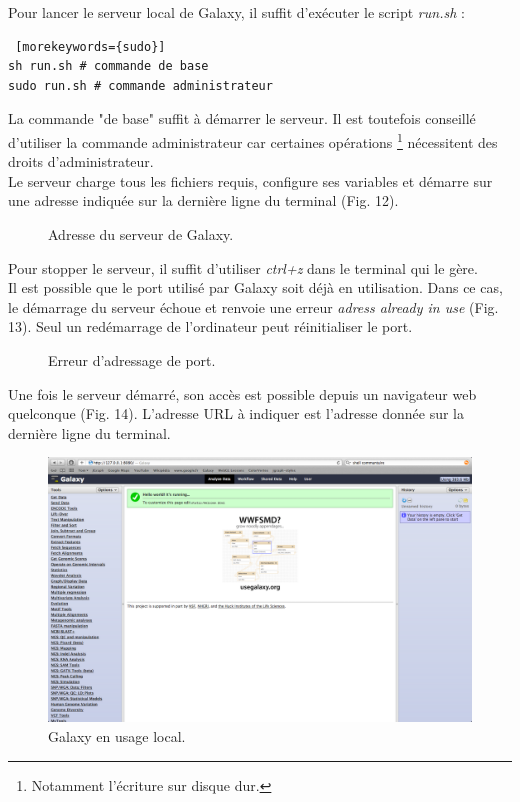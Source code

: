 Pour lancer le serveur local de Galaxy, il suffit d'exécuter le script \textit{run.sh} : 
\lstset{language=sh}
\begin{lstlisting} [morekeywords={sudo}]
sh run.sh # commande de base
sudo run.sh # commande administrateur
 \end{lstlisting} 
 
 La commande "de base" suffit à démarrer le serveur. Il est toutefois conseillé d'utiliser la commande administrateur car certaines opérations \footnote{Notamment l'écriture sur disque dur.} nécessitent des droits d'administrateur.\\
 
 Le serveur charge tous les fichiers requis, configure ses variables et démarre sur une adresse indiquée sur la dernière ligne du terminal (Fig. 12).
 
 \begin{figure}[!h]
 \centering
{}
\caption{Adresse du serveur de Galaxy.}
\end{figure}

Pour stopper le serveur, il suffit d'utiliser \textit{ctrl+z} dans le terminal qui le gère.\\

Il est possible que le port utilisé par Galaxy soit déjà en utilisation. Dans ce cas, le démarrage du serveur échoue et renvoie une erreur \textit{adress already in use} (Fig. 13). Seul un redémarrage de l'ordinateur peut réinitialiser le port.

 \begin{figure}[!h]
 \centering
{}
\caption{Erreur d'adressage de port.}
\end{figure}
Une fois le serveur démarré, son accès est possible depuis un navigateur web quelconque (Fig. 14). L'adresse URL à indiquer est l'adresse donnée sur la dernière ligne du terminal.

 \begin{figure}[!h]
 \centering
\includegraphics[scale=0.35]{Images/Galaxylocal.png}
\caption{Galaxy en usage local.}
\end{figure}